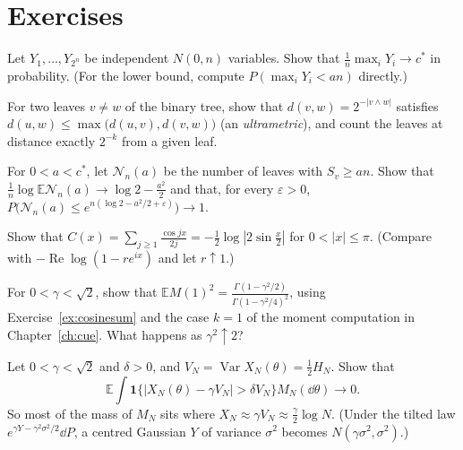 \section{Exercises}

\begin{exercise}[$\star$]\label{ex:indepmax}
Let $Y_1,\dots,Y_{2^n}$ be independent $N(0,n)$ variables. Show that $\frac1n\max_iY_i\to c^*$ in probability. (For the lower bound, compute $P(\max_iY_i<an)$ directly.)
\end{exercise}

\begin{exercise}[$\star$]\label{ex:ultrametric}
For two leaves $v\ne w$ of the binary tree, show that $d(v,w)=2^{-|v\wedge w|}$ satisfies $d(u,w)\le\max\bigl(d(u,v),d(v,w)\bigr)$ (an \emph{ultrametric}), and count the leaves at distance exactly $2^{-k}$ from a given leaf.
\end{exercise}

\begin{exercise}[$\star\star$]\label{ex:thickcount}
For $0<a<c^*$, let $\mathcal N_n(a)$ be the number of leaves with $S_v\ge an$. Show that $\frac1n\log\mathbb E\mathcal N_n(a)\to\log2-\frac{a^2}2$ and that, for every $\varepsilon>0$, $P\bigl(\mathcal N_n(a)\le e^{n(\log2-a^2/2+\varepsilon)}\bigr)\to1$.
\end{exercise}

\begin{exercise}[$\star\star$]\label{ex:cosinesum}
Show that $C(x)=\sum_{j\ge1}\frac{\cos jx}{2j}=-\frac12\log|2\sin\frac x2|$ for $0<|x|\le\pi$. (Compare with $-\operatorname{Re}\log(1-re^{ix})$ and let $r\uparrow1$.)
\end{exercise}

\begin{exercise}[$\star\star$]\label{ex:gmcmass}
For $0<\gamma<\sqrt2$, show that $\mathbb EM(1)^2=\frac{\Gamma(1-\gamma^2/2)}{\Gamma(1-\gamma^2/4)^2}$, using Exercise~\ref{ex:cosinesum} and the case $k=1$ of the moment computation in Chapter~\ref{ch:cue}. What happens as $\gamma^2\uparrow2$?
\end{exercise}

\begin{exercise}[$\star\star$]\label{ex:thickchaos}
Let $0<\gamma<\sqrt2$ and $\delta>0$, and $V_N=\operatorname{Var}X_N(\theta)=\frac12H_N$. Show that
\[
\mathbb E\int\mathbf 1\bigl\{|X_N(\theta)-\gamma V_N|>\delta V_N\bigr\}M_N(\dd\theta)\longrightarrow0 .
\]
So most of the mass of $M_N$ sits where $X_N\approx\gamma V_N\approx\frac\gamma2\log N$. (Under the tilted law $e^{\gamma Y-\gamma^2\sigma^2/2}\dd P$, a centred Gaussian $Y$ of variance $\sigma^2$ becomes $N(\gamma\sigma^2,\sigma^2)$.)
\end{exercise}

